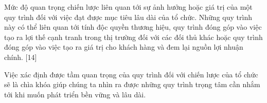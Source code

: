 Mức độ quan trọng chiến lược liên quan tới sự ảnh hưởng hoặc giá trị của một quy trình đối với việc đạt được mục tiêu lâu dài của tổ chức. Những quy trình này có thể liên quan tới tính độc quyền thương hiệu, quy trình đóng góp vào việc tạo ra lợi thế cạnh tranh trong thị trường đối với các đối thủ khác hoặc quy trình đóng góp vào việc tạo ra giá trị cho khách hàng và đem lại nguồn lợi nhuận chính. [14]

Việc xác định được tầm quan trọng của quy trình đối với chiến lược của tổ chức sẽ là chìa khóa giúp chúng ta nhìn ra được những quy trình trọng tâm cần nhắm tới khi muốn phát triển bền vững và lâu dài.